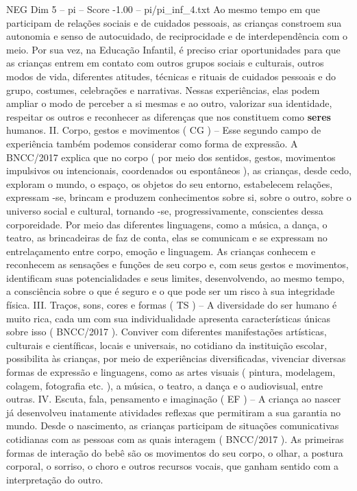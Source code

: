 \begin{textsample}{NEG Dim 5 – pi – Score -1.00 – pi/pi\_inf\_4.txt}
Ao mesmo tempo em que participam de relações sociais e de cuidados pessoais, as crianças constroem sua autonomia e senso de autocuidado, de reciprocidade e de interdependência com o meio.
Por sua vez, na Educação Infantil, é preciso criar oportunidades para que as crianças entrem em contato com outros grupos sociais e culturais, outros modos de vida, diferentes atitudes, técnicas e rituais de cuidados pessoais e do grupo, costumes, celebrações e narrativas.
Nessas experiências, elas podem ampliar o modo de perceber a si mesmas e ao outro, valorizar sua identidade, respeitar os outros e reconhecer as diferenças que nos constituem como \textbf{seres} humanos.
II.
Corpo, gestos e movimentos ( CG ) – Esse segundo campo de experiência também podemos considerar como forma de expressão.
A BNCC/2017 explica que no corpo ( por meio dos sentidos, gestos, movimentos impulsivos ou intencionais, coordenados ou espontâneos ), as crianças, desde cedo, exploram o mundo, o espaço, os objetos do seu entorno, estabelecem relações, expressam -se, brincam e produzem conhecimentos sobre si, sobre o outro, sobre o universo social e cultural, tornando -se, progressivamente, conscientes dessa corporeidade.
Por meio das diferentes linguagens, como a música, a dança, o teatro, as brincadeiras de faz de conta, elas se comunicam e se expressam no entrelaçamento entre corpo, emoção e linguagem.
As crianças conhecem e reconhecem as sensações e funções de seu corpo e, com seus gestos e movimentos, identificam suas potencialidades e seus limites, desenvolvendo, ao mesmo tempo, a consciência sobre o que é seguro e o que pode ser um risco à sua integridade física.
III.
Traços, sons, cores e formas ( TS ) – A diversidade do ser humano é muito rica, cada um com sua individualidade apresenta características únicas sobre isso ( BNCC/2017 ).
Conviver com diferentes manifestações artísticas, culturais e científicas, locais e universais, no cotidiano da instituição escolar, possibilita às crianças, por meio de experiências diversificadas, vivenciar diversas formas de expressão e linguagens, como as artes visuais ( pintura, modelagem, colagem, fotografia etc. ), a música, o teatro, a dança e o audiovisual, entre outras.
IV.
Escuta, fala, pensamento e imaginação ( EF ) – A criança ao nascer já desenvolveu inatamente atividades reflexas que permitiram a sua garantia no mundo.
Desde o nascimento, as crianças participam de situações comunicativas cotidianas com as pessoas com as quais interagem ( BNCC/2017 ).
As primeiras formas de interação do bebê são os movimentos do seu corpo, o olhar, a postura corporal, o sorriso, o choro e outros recursos vocais, que ganham sentido com a interpretação do outro.

\end{textsample}
